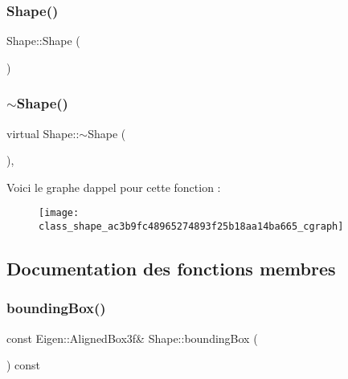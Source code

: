 \subsubsection{\texorpdfstring{Shape()}{Shape()}}
{\footnotesize\ttfamily Shape\+::\+Shape (\begin{DoxyParamCaption}{ }\end{DoxyParamCaption})\hspace{0.3cm}{\ttfamily [inline]}}

\mbox{\label{class_shape_ac3b9fc48965274893f25b18aa14ba665}} 
\subsubsection{\texorpdfstring{$\sim$\+Shape()}{~Shape()}}
{\footnotesize\ttfamily virtual Shape\+::$\sim$\+Shape (\begin{DoxyParamCaption}{ }\end{DoxyParamCaption})\hspace{0.3cm}{\ttfamily [inline]}, {\ttfamily [virtual]}}

Voici le graphe d\textquotesingle{}appel pour cette fonction \+:\nopagebreak
\begin{figure}[H]
\begin{center}
\leavevmode
\texttt{[image: class\_shape\_ac3b9fc48965274893f25b18aa14ba665\_cgraph]}
\end{center}
\end{figure}


\subsection{Documentation des fonctions membres}
\mbox{\label{class_shape_acd24561b01d6769b4a0c96cd0237a961}} 
\subsubsection{\texorpdfstring{bounding\+Box()}{boundingBox()}}
{\footnotesize\ttfamily const Eigen\+::\+Aligned\+Box3f\& Shape\+::bounding\+Box (\begin{DoxyParamCaption}{ }\end{DoxyParamCaption}) const\hspace{0.3cm}{\ttfamily [inline]}}



